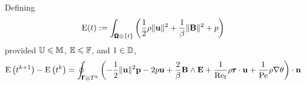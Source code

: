     \begin{theorem}
        Defining
        \begin{equation}
            \mathrm{E}(t)  :=  \int_{\pmb{\mathsf{\Omega}}\otimes\{t\}}\left(\frac{1}{2}\rho\|\mathbf{u}\|^{2} + \frac{1}{\beta}\|\mathbf{B}\|^{2} + p\right)
        \end{equation}
        provided $\mathbb{U}  \leqslant  \mathbb{M}$, $\mathbb{E} 
         \leqslant  \mathbb{F}$, and $1  \in  \mathbb{D}$,
        \begin{equation}
            \mathrm{E}\left(t^{k + 1}\right) - \mathrm{E}\left(t^{k}\right)  =  \oint_{\pmb{\mathsf{\Gamma}}\otimes T^{k}}\left(- \frac{1}{2}\|\mathbf{u}\|^{2}\mathbf{p} - 2p\mathbf{u} + \frac{2}{\beta}\mathbf{B}\wedge\mathbf{E} + \frac{1}{\mathrm{Re}_{\mathrm{f}}}\rho\pmb{\mathsf{\tau}}\cdot\mathbf{u} + \frac{1}{\mathrm{Pe}}\rho\nabla\theta\right)\cdot\mathbf{n}
        \end{equation}
    \end{theorem}
